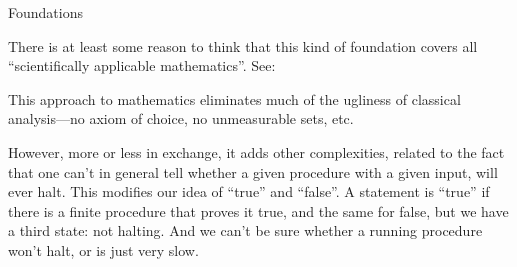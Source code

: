 \documentclass[12pt]{PalisadesLakesBook}
\begin{document}
\begin{plSection}{Foundations}
\begin{itemize}
There is at least some reason to think 
that this kind of foundation covers all ``scientifically
applicable mathematics''.
See:

This approach to mathematics eliminates much of the ugliness
of classical analysis---no axiom of choice, no unmeasurable
sets, etc.

However, more or less in exchange, it adds other complexities,
related to the fact that one can't in general tell whether a given
procedure with a given input, will ever halt.
This modifies our idea of ``true'' and ``false''.
A statement is ``true'' if there is a finite procedure that
proves it true, and the same for false,
but we have a third state: not halting. 
And we can't be sure whether a running procedure won't halt,
or is just very slow.

\end{itemize}

\end{plSection}%
\end{document}
